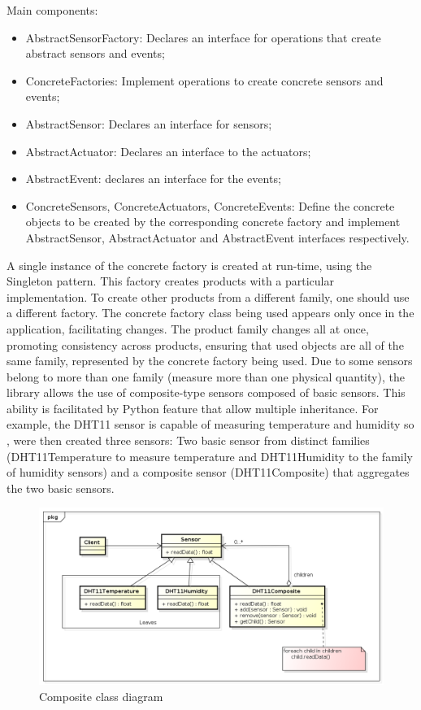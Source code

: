 \documentclass{acm_proc_article-sp}
\begin{document}
Main components:
\begin{itemize}
\item AbstractSensorFactory: Declares an interface for operations that create abstract sensors and events;
\item ConcreteFactories: Implement operations to create concrete sensors and events;
\item AbstractSensor: Declares an interface for sensors;
\item AbstractActuator: Declares an interface to the actuators;
\item AbstractEvent: declares an interface for the events;
\item ConcreteSensors, ConcreteActuators, ConcreteEvents: Define the concrete objects to be created by the corresponding concrete factory and implement AbstractSensor, AbstractActuator and AbstractEvent interfaces respectively.

\end{itemize}

A single instance of the concrete factory is created at run-time, using the Singleton pattern. This factory creates products with a particular implementation. To create other products from a different family, one should use a different factory. The concrete factory class being used appears only once in the application, facilitating changes. The product family changes all at once, promoting consistency across products, ensuring that used objects are all of the same family, represented by the concrete factory being used.
\newline
\newline
Due to some sensors belong to more than one family (measure more than one physical quantity), the library allows the use of composite-type sensors composed of basic sensors. This ability is facilitated by Python feature that allow multiple inheritance. For example, the DHT11 sensor is capable of measuring temperature and humidity so , were then created three sensors: Two basic sensor from distinct families (DHT11Temperature to measure temperature and DHT11Humidity to the family of humidity sensors) and a composite sensor (DHT11Composite) that aggregates the two basic sensors.
\begin{figure}[ht]
    \includegraphics[width=1.0\textwidth,natwidth=610,natheight=642]{pictures/composite.png}
    \caption{Composite class diagram}
    \label{fig:composite}
\end{figure}
\end{document}
